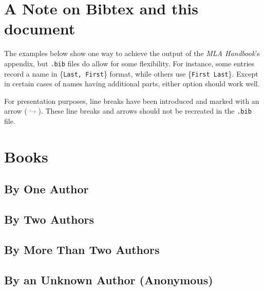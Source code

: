 \documentclass{article}
\begin{document}
	
\section*{A Note on Bibtex and this document}
The examples below show one way to achieve the output of the \emph{MLA Handbook}'s appendix, but \texttt{.bib} files do allow for some flexibility. For instance, some entries record a name in \{\texttt{Last, First}\} format, while others use \{\texttt{First Last}\}. Except in certain cases of names having additional parts, either option should work well. 

For presentation purposes, line breaks have been introduced and marked with an arrow (\textcolor{gray}{$\hookrightarrow$}). These line breaks and arrows should not be recreated in the \texttt{.bib} file.

\section{Books} %
\label{sec:books}

\subsection{By One Author} %
\label{ssub:by_one_author}
\begin{refsection}
	\printbibliography[heading=none]
\end{refsection}
\subsection{By Two Authors} %
\label{ssub:by_two_authors}
\begin{refsection}
	\printbibliography[heading=none]
\end{refsection}
\subsection{By More Than Two Authors} %
\label{ssub:by_more_than_two_authors}
\begin{refsection}
	\printbibliography[heading=none]
\end{refsection}
\subsection{By an Unknown Author (Anonymous)} %
\label{ssub:by_an_unknown_author_anonymous}
\begin{refsection}
	\printbibliography[heading=none]
\end{refsection}
\end{document}
